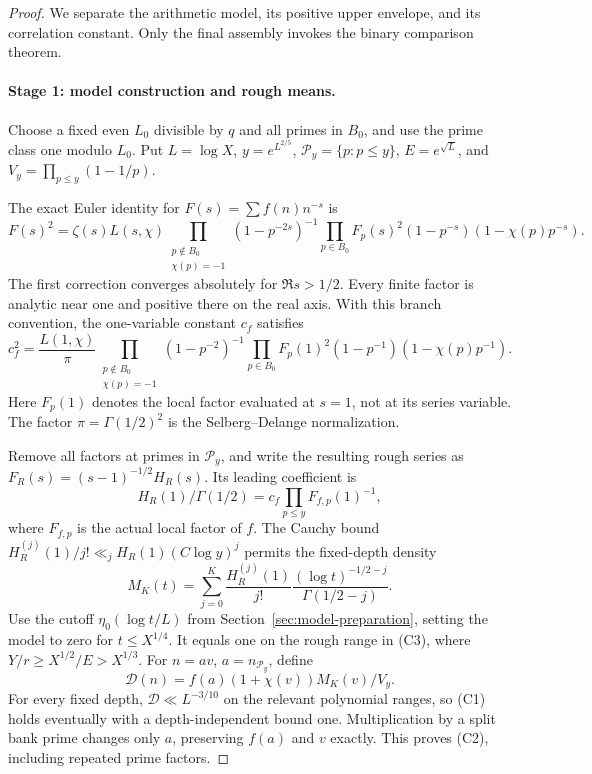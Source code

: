 \begin{proof}
We separate the arithmetic model, its positive upper envelope, and
its correlation constant. Only the final assembly invokes the binary
comparison theorem.

\paragraph{Stage 1: model construction and rough means.}
Choose a fixed even \(L_0\) divisible by \(q\) and all primes
in \(B_0\), and use the prime class one modulo \(L_0\).
Put \(L=\log X\), \(y=e^{L^{2/5}}\), \(\mathcal P_y=\{p:p\le y\}\),
\(E=e^{\sqrt L}\), and \(V_y=\prod_{p\le y}(1-1/p)\).

The exact Euler identity for \(F(s)=\sum f(n)n^{-s}\) is
\begin{equation}\label{eq:quadratic-euler-square}
 F(s)^2=\zeta(s)L(s,\chi)
 \prod_{\substack{p\notin B_0\\\chi(p)=-1}}(1-p^{-2s})^{-1}
 \prod_{p\in B_0}F_p(s)^2(1-p^{-s})(1-\chi(p)p^{-s}).
\end{equation}
The first correction converges absolutely for \(\Re s>1/2\).
Every finite factor is analytic near one and positive there on
the real axis. With this branch convention, the one-variable
constant \(c_f\) satisfies
\begin{equation}\label{eq:quadratic-marginal}
 c_f^2=\frac{L(1,\chi)}\pi
 \prod_{\substack{p\notin B_0\\\chi(p)=-1}}(1-p^{-2})^{-1}
 \prod_{p\in B_0}F_p(1)^2(1-p^{-1})(1-\chi(p)p^{-1}).
\end{equation}
Here \(F_p(1)\) denotes the local factor evaluated at \(s=1\),
not at its series variable. The factor \(\pi=\Gamma(1/2)^2\)
is the Selberg--Delange normalization.

Remove all factors at primes in \(\mathcal P_y\), and write the resulting
rough series as \(F_R(s)=(s-1)^{-1/2}H_R(s)\). Its leading
coefficient is
\[
 H_R(1)/\Gamma(1/2)
          =c_f\prod_{p\le y}F_{f,p}(1)^{-1},
\]
where \(F_{f,p}\) is the actual local factor of \(f\).
The Cauchy bound
\(H_R^{(j)}(1)/j!\ll_j H_R(1)(C\log y)^j\) permits the
fixed-depth density
\[
 M_K(t)=\sum_{j=0}^K\frac{H_R^{(j)}(1)}{j!}
              \frac{(\log t)^{-1/2-j}}{\Gamma(1/2-j)}.
\]
Use the cutoff \(\eta_0(\log t/L)\) from Section~\ref{sec:model-preparation},
setting the model to zero for \(t\le X^{1/4}\). It equals one on the
rough range in (C3), where \(Y/r\ge X^{1/2}/E>X^{1/3}\).
For \(n=av\), \(a=n_{\mathcal P_y}\), define
\begin{equation}\label{eq:quadratic-model}
 \mathcal D(n)=f(a)(1+\chi(v))M_K(v)/V_y.
\end{equation}
For every fixed depth, \(\mathcal D\ll L^{-3/10}\) on the relevant
polynomial ranges, so (C1) holds eventually with a depth-independent
bound one. Multiplication by a split bank prime changes only
\(a\), preserving \(f(a)\) and \(v\) exactly. This proves (C2),
including repeated prime factors.


\end{proof}
